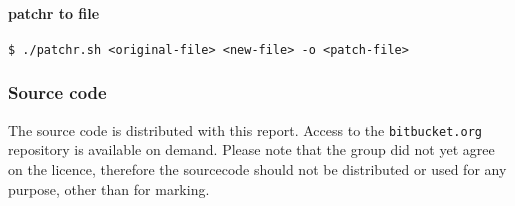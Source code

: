 \documentclass[10pt,a4paper]{article}
\begin{document}
\paragraph{patchr to file} \texttt{\$ ./patchr.sh <original-file> <new-file> -o <patch-file>} 

\subsubsection*{Source code}
The source code is distributed with this report. Access to the \texttt{bitbucket.org} repository is available on demand. Please note that the group did not yet agree on the licence, therefore the sourcecode should not be distributed or used for any purpose, other than for marking. 



\end{document}

